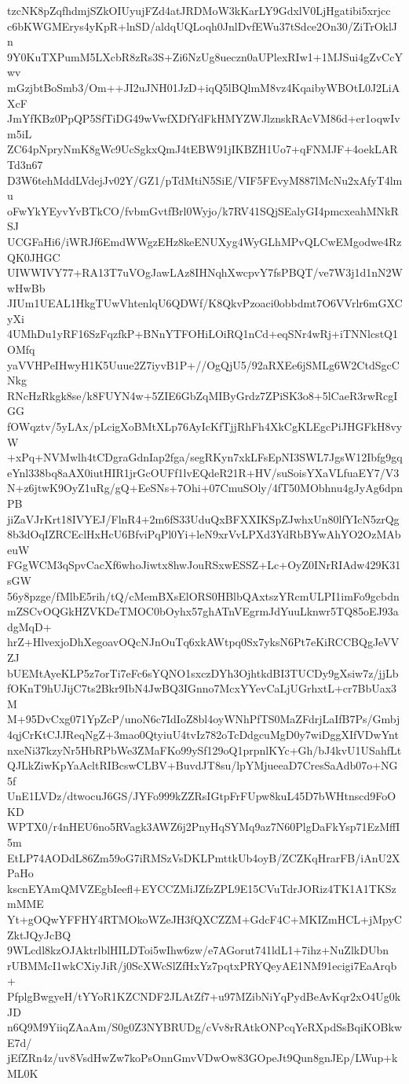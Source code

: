 tzcNK8pZqfhdmjSZkOIUyujFZd4atJRDMoW3kKarLY9GdxlV0LjHgatibi5xrjcc
c6bKWGMErys4yKpR+lnSD/aldqUQLoqh0JnlDvfEWu37tSdce2On30/ZiTrOklJn
9Y0KuTXPumM5LXcbR8zRs3S+Zi6NzUg8ueczn0aUPlexRIw1+1MJSui4gZvCcYwv
mGzjbtBoSmb3/Om++JI2uJNH01JzD+iqQ5lBQlmM8vz4KqaibyWBOtL0J2LiAXcF
JmYfKBz0PpQP5SfTiDG49wVwfXDfYdFkHMYZWJlznskRAcVM86d+er1oqwIvm5iL
ZC64pNpryNmK8gWc9UcSgkxQmJ4tEBW91jIKBZH1Uo7+qFNMJF+4oekLARTd3n67
D3W6tehMddLVdejJv02Y/GZ1/pTdMtiN5SiE/VIF5FEvyM887lMcNu2xAfyT4lmu
oFwYkYEyvYvBTkCO/fvbmGvtfBrl0Wyjo/k7RV41SQjSEalyGI4pmcxeahMNkRSJ
UCGFaHi6/iWRJf6EmdWWgzEHz8keENUXyg4WyGLhMPvQLCwEMgodwe4RzQK0JHGC
UIWWIVY77+RA13T7uVOgJawLAz8IHNqhXwcpvY7fsPBQT/ve7W3j1d1nN2WwHwBb
JIUm1UEAL1HkgTUwVhtenlqU6QDWf/K8QkvPzoaci0obbdmt7O6VVrlr6mGXCyXi
4UMhDu1yRF16SzFqzfkP+BNnYTFOHiLOiRQ1nCd+eqSNr4wRj+iTNNlcstQ1OMfq
yaVVHPeIHwyH1K5Uuue2Z7iyvB1P+//OgQjU5/92aRXEe6jSMLg6W2CtdSgcCNkg
RNcHzRkgk8se/k8FUYN4w+5ZIE6GbZqMIByGrdz7ZPiSK3o8+5lCaeR3rwRcgIGG
fOWqztv/5yLAx/pLcigXoBMtXLp76AyIcKfTjjRhFh4XkCgKLEgcPiJHGFkH8vyW
+xPq+NVMwlh4tCDgraGdnIap2fga/segRKyn7xkLFsEpNI3SWL7JgsW12Ibfg9gq
eYnl338bq8aAX0iutHIR1jrGcOUFf1lvEQdeR21R+HV/suSoisYXaVLfuaEY7/V3
N+z6jtwK9OyZ1uRg/gQ+EeSNs+7Ohi+07CmuSOly/4fT50MObhnu4gJyAg6dpnPB
jiZaVJrKrt18IVYEJ/FlnR4+2m6fS33UduQxBFXXIKSpZJwhxUn80lfYIcN5zrQg
8b3dOqIZRCEclHxHcU6BfviPqPl0Yi+leN9xrVvLPXd3YdRbBYwAhYO2OzMAbeuW
FGgWCM3qSpvCacXf6whoJiwtx8hwJouRSxwESSZ+Lc+OyZ0INrRIAdw429K31sGW
56y8pzge/fMlbE5rih/tQ/cMemBXsElORS0HBlbQAxtszYRcmULPI1imFo9gcbdn
mZSCvOQGkHZVKDeTMOC0bOyhx57ghATnVEgrmJdYuuLknwr5TQ85oEJ93adgMqD+
hrZ+HlvexjoDhXegoavOQcNJnOuTq6xkAWtpq0Sx7yksN6Pt7eKiRCCBQgJeVVZJ
bUEMtAyeKLP5z7orTi7eFc6sYQNO1sxczDYh3OjhtkdBI3TUCDy9gXsiw7z/jjLb
fOKnT9hUJijC7ts2Bkr9IbN4JwBQ3IGnno7McxYYevCaLjUGrhxtL+cr7BbUax3M
M+95DvCxg071YpZcP/unoN6c7IdIoZ8bl4oyWNhPfTS0MaZFdrjLaIfB7Ps/Gmbj
4qjCrKtCJJReqNgZ+3mao0QtyiuU4tvIz782oTcDdgcuMgD0y7wiDggXIfVDwYnt
nxeNi37kzyNr5HbRPbWe3ZMaFKo99ySf129oQ1prpnlKYc+Gh/bJ4kvU1USahfLt
QJLkZiwKpYaAcltRIBcswCLBV+BuvdJT8su/lpYMjueeaD7CresSaAdb07o+NG5f
UnE1LVDz/dtwocuJ6GS/JYFo999kZZRsIGtpFrFUpw8kuL45D7bWHtnscd9FoOKD
WPTX0/r4nHEU6no5RVagk3AWZ6j2PnyHqSYMq9az7N60PlgDaFkYsp71EzMffI5m
EtLP74AODdL86Zm59oG7iRMSzVsDKLPmttkUb4oyB/ZCZKqHrarFB/iAnU2XPaHo
kscnEYAmQMVZEgbIeefl+EYCCZMiJZfzZPL9E15CVuTdrJORiz4TK1A1TKSzmMME
Yt+gOQwYFFHY4RTMOkoWZeJH3fQXCZZM+GdcF4C+MKIZmHCL+jMpyCZktJQyJcBQ
9WLcdl8kzOJAktrlblHILDToi5wIhw6zw/e7AGorut741ldL1+7ihz+NuZlkDUbn
rUBMMcI1wkCXiyJiR/j0ScXWcSlZfHxYz7pqtxPRYQeyAE1NM91ecigi7EaArqb+
PfplgBwgyeH/tYYoR1KZCNDF2JLAtZf7+u97MZibNiYqPydBeAvKqr2xO4Ug0kJD
n6Q9M9YiiqZAaAm/S0g0Z3NYBRUDg/cVv8rRAtkONPcqYeRXpdSsBqiKOBkwE7d/
jEfZRn4z/uv8VsdHwZw7koPsOnnGmvVDwOw83GOpeJt9Qun8gnJEp/LWup+kML0K
